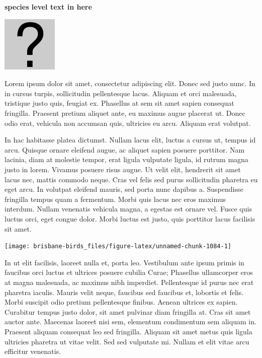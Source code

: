 \documentclass[]{book}
\let\origfigure\figure
\let\endorigfigure\endfigure
\renewenvironment{figure}[1][2] {
  \expandafter\origfigure\expandafter[H]
} {
  \endorigfigure
}
\begin{document}
\textbf{species level text in here}

\begin{figure}
\centering
\includegraphics{assets/missing.png}
\caption{No image for species}
\end{figure}

Lorem ipsum dolor sit amet, consectetur adipiscing elit. Donec sed justo
nunc. In in cursus turpis, sollicitudin pellentesque lacus. Aliquam et
orci malesuada, tristique justo quis, feugiat ex. Phasellus at sem sit
amet sapien consequat fringilla. Praesent pretium aliquet ante, eu
maximus augue placerat ut. Donec odio erat, vehicula non accumsan quis,
ultricies eu arcu. Aliquam erat volutpat.

In hac habitasse platea dictumst. Nullam lacus elit, luctus a cursus ut,
tempus id arcu. Quisque ornare eleifend augue, ac aliquet sapien posuere
porttitor. Nam lacinia, diam at molestie tempor, erat ligula vulputate
ligula, id rutrum magna justo in lorem. Vivamus posuere risus augue. Ut
velit elit, hendrerit sit amet lacus nec, mattis commodo neque. Cras vel
felis sed purus sollicitudin pharetra eu eget arcu. In volutpat eleifend
mauris, sed porta nunc dapibus a. Suspendisse fringilla tempus quam a
fermentum. Morbi quis lacus nec eros maximus interdum. Nullam venenatis
vehicula magna, a egestas est ornare vel. Fusce quis luctus orci, eget
congue dolor. Morbi luctus est justo, quis porttitor lacus facilisis sit
amet.

\begin{figure}
\texttt{[image: brisbane-birds\_files/figure-latex/unnamed-chunk-1084-1]} \caption{insert figure caption}\label{fig:unnamed-chunk-1084}
\end{figure}

In ut elit facilisis, laoreet nulla et, porta leo. Vestibulum ante ipsum
primis in faucibus orci luctus et ultrices posuere cubilia Curae;
Phasellus ullamcorper eros at magna malesuada, ac maximus nibh
imperdiet. Pellentesque id purus nec erat pharetra iaculis. Mauris velit
neque, faucibus sed faucibus et, lobortis et felis. Morbi suscipit odio
pretium pellentesque finibus. Aenean ultrices ex sapien. Curabitur
tempus justo dolor, sit amet pulvinar diam fringilla at. Cras sit amet
auctor ante. Maecenas laoreet nisi sem, elementum condimentum sem
aliquam in. Praesent aliquam consequat leo sed fringilla. Aliquam sit
amet metus quis ligula ultricies pharetra ut vitae velit. Sed sed
vulputate mi. Nullam et elit vitae arcu efficitur venenatis.
\end{document}
